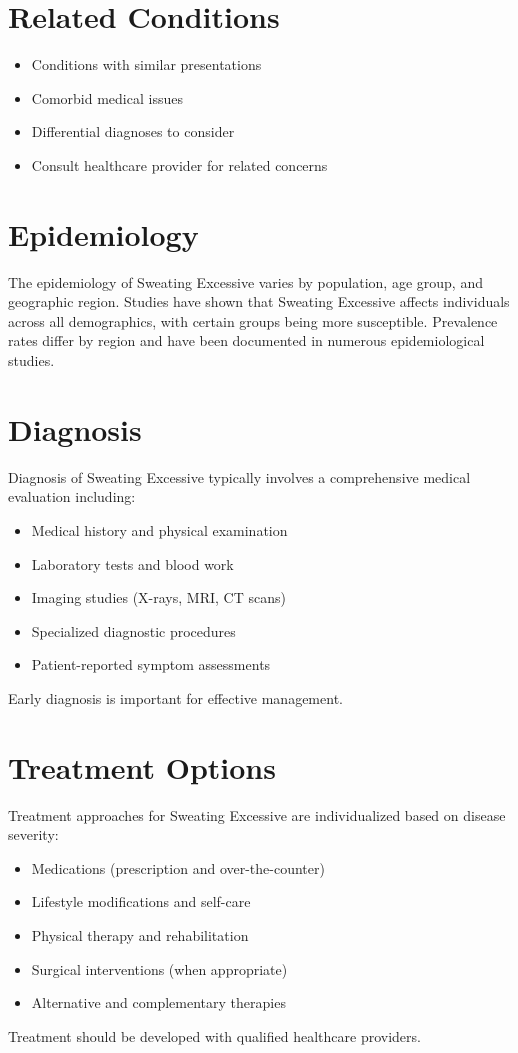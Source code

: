 \section*{Related Conditions}
\begin{itemize}
  \item Conditions with similar presentations
  \item Comorbid medical issues
  \item Differential diagnoses to consider
  \item Consult healthcare provider for related concerns
\end{itemize}

\section*{Epidemiology}
The epidemiology of Sweating Excessive varies by population, age group, and geographic region. Studies have shown that Sweating Excessive affects individuals across all demographics, with certain groups being more susceptible. Prevalence rates differ by region and have been documented in numerous epidemiological studies.

\section*{Diagnosis}
Diagnosis of Sweating Excessive typically involves a comprehensive medical evaluation including:
\begin{itemize}
  \item Medical history and physical examination
  \item Laboratory tests and blood work
  \item Imaging studies (X-rays, MRI, CT scans)
  \item Specialized diagnostic procedures
  \item Patient-reported symptom assessments
\end{itemize}
Early diagnosis is important for effective management.

\section*{Treatment Options}
Treatment approaches for Sweating Excessive are individualized based on disease severity:
\begin{itemize}
  \item Medications (prescription and over-the-counter)
  \item Lifestyle modifications and self-care
  \item Physical therapy and rehabilitation
  \item Surgical interventions (when appropriate)
  \item Alternative and complementary therapies
\end{itemize}
Treatment should be developed with qualified healthcare providers.

